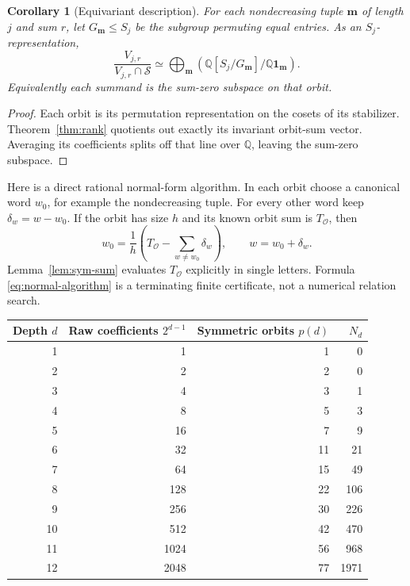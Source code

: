 \documentclass[11pt]{article}
\numberwithin{equation}{section}
\newtheorem{corollary}[theorem]{Corollary}
\theoremstyle{definition}
\newcommand{\SSS}{\mathscr S}
\newcommand{\bbm}{\boldsymbol m}
\begin{document}
\begin{corollary}[Equivariant description]\label{cor:representation}
For each nondecreasing tuple $\bbm$ of length $j$ and sum $r$, let
$G_{\bbm}\le S_j$ be the subgroup permuting equal entries. As an
$S_j$-representation,
\begin{equation}\label{eq:permutation-modules}
 \frac{V_{j,r}}{V_{j,r}\cap\SSS}
 \simeq\bigoplus_{\bbm}
 \left(\mathbb Q[S_j/G_{\bbm}]/\mathbb Q\mathbf1_{\bbm}\right).
\end{equation}
Equivalently each summand is the sum-zero subspace on that orbit.
\end{corollary}
\begin{proof}
Each orbit is its permutation representation on the cosets of its
stabilizer. Theorem~\ref{thm:rank} quotients out exactly its invariant
orbit-sum vector. Averaging its coefficients splits off that line over
$\mathbb Q$, leaving the sum-zero subspace.
\end{proof}

Here is a direct rational normal-form algorithm. In each orbit choose a
canonical word $w_0$, for example the nondecreasing tuple. For every other
word keep $\delta_w=w-w_0$. If the orbit has size $h$ and its known
orbit sum is $T_{\mathcal O}$, then
\begin{equation}\label{eq:normal-algorithm}
 w_0=\frac1h\left(T_{\mathcal O}-\sum_{w\ne w_0}\delta_w\right),
 \qquad w=w_0+\delta_w.
\end{equation}
Lemma~\ref{lem:sym-sum} evaluates $T_{\mathcal O}$ explicitly in single
letters. Formula \eqref{eq:normal-algorithm} is a terminating finite
certificate, not a numerical relation search.

\begin{center}
\begin{tabular}{rrrr}
\toprule
Depth $d$ & Raw coefficients $2^{d-1}$ & Symmetric orbits $p(d)$ & $N_d$\\
\midrule
1&1&1&0\\2&2&2&0\\3&4&3&1\\4&8&5&3\\
5&16&7&9\\6&32&11&21\\7&64&15&49\\8&128&22&106\\
9&256&30&226\\10&512&42&470\\11&1024&56&968\\12&2048&77&1971\\
\bottomrule
\end{tabular}
\end{center}
\end{document}
